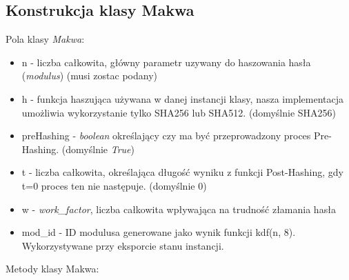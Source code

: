 \documentclass[a4paper,titleauthor]{mwart}
\begin{document}
\subsection{Konstrukcja klasy Makwa}
Pola klasy \textit{Makwa}:
\begin{itemize}
	\item n - liczba całkowita, główny parametr uzywany do haszowania hasła (\textit{modulus}) (musi zostac podany)
	\item h - funkcja haszująca używana w danej instancji klasy, nasza implementacja umożliwia wykorzystanie tylko SHA256 lub SHA512. (domyślnie SHA256)
	\item preHashing - \textit{boolean} określający czy ma być przeprowadzony proces Pre-Hashing. (domyślnie \textit{True})
	\item t - liczba całkowita, określająca długość wyniku z funkcji Post-Hashing, gdy t=0 proces ten nie następuje. (domyślnie 0)
	\item w - \textit{work\_factor}, liczba całkowita wpływająca na trudność złamania hasła
	\item mod\_id - ID modulusa generowane jako wynik funkcji kdf(n, 8). Wykorzystywane przy eksporcie stanu instancji.
\end{itemize}
Metody klasy Makwa:
\end{document}
